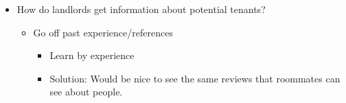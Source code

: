 \documentclass{article}
\begin{document}
\begin{appendices}
\begin{itemize}
\begin{itemize}
        \end{itemize}
    \item How do landlords get information about potential tenants?
        \begin{itemize}
            \item Go off past experience/references
            \begin{itemize}
                \item Learn by experience
                \item Solution: Would be nice to see the same reviews that roommates can see about people.
            \end{itemize}
        \end{itemize}
\end{itemize}

\end{appendices}
\end{document}
